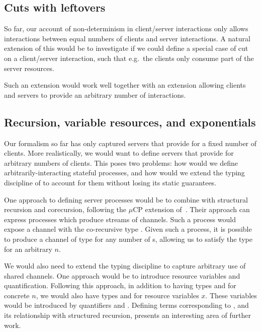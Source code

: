 \documentclass[UKenglish]{llncs}
\begin{document}
\subsection{Cuts with leftovers}
So far, our account of non-determinism in client/server interactions only allows
interactions between equal numbers of clients and server interactions. A natural
extension of this would be to investigate if we could define a special case of
cut on a client/server interaction, such that e.g.\ the clients only consume
part of the server resources.
\begin{scprooftree}
\end{scprooftree}
Such an extension would work well together with an extension allowing clients
and servers to provide an arbitrary number of interactions.

\subsection{Recursion, variable resources, and exponentials}
Our formalism so far has only captured servers that provide for a fixed number
of clients.  More realistically, we would want to define servers that provide
for arbitrary numbers of clients.  This poses two problems: how would we define
arbitrarily-interacting stateful processes, and how would we extend the
typing discipline of \nodcap to account for them without losing its static
guarantees.

One approach to defining server processes would be to combine \nodcap with
structural recursion and corecursion, following the $\mu\text{CP}$ extension
of~\textcite{lindley2016}.  Their approach can express processes which produce
streams of  channels. Such a process would expose a channel with the
co-recursive type .  Given such a process, it is
possible to produce a channel of type  for
any number of s, allowing us to satisfy the type  for an
arbitrary $n$.

We would also need to extend the typing discipline to capture arbitrary use of
shared channels.  One approach would be to introduce resource variables and
quantification.  Following this approach, in addition to having types
 and  for concrete $n$, we would also have types
 and  for resource variables $x$.  These variables
would be introduced by quantifiers  and .
Defining terms corresponding to , and its relationship with
structured recursion, presents an interesting area of further work.
\end{document}
